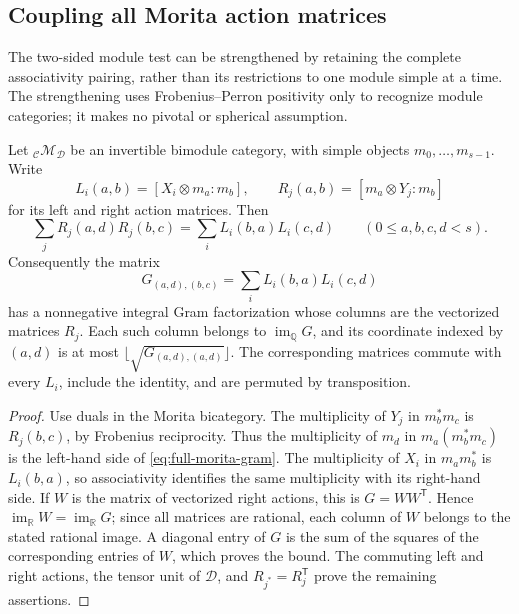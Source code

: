 \subsection{Coupling all Morita action matrices}\label{sec:full-morita-gram}
The two-sided module test can be strengthened by retaining the complete
associativity pairing, rather than its restrictions to one module simple at
a time. The strengthening uses Frobenius--Perron positivity only to recognize
module categories; it makes no pivotal or spherical assumption.

\begin{theorem}\label{thm:full-morita-gram}
Let ${}_{\mathcal C}\mathcal M_{\mathcal D}$ be an invertible bimodule
category, with simple objects $m_0,\ldots,m_{s-1}$. Write
\[
 L_i(a,b)=[X_i\otimes m_a:m_b],\qquad
 R_j(a,b)=[m_a\otimes Y_j:m_b]
\]
for its left and right action matrices. Then
\begin{equation}\label{eq:full-morita-gram}
 \sum_j R_j(a,d)R_j(b,c)
       =\sum_i L_i(b,a)L_i(c,d)
       \qquad(0\leq a,b,c,d<s).
\end{equation}
Consequently the matrix
\[
 G_{(a,d),(b,c)}=\sum_i L_i(b,a)L_i(c,d)
\]
has a nonnegative integral Gram factorization whose columns are the
vectorized matrices $R_j$. Each such column belongs to
$\operatorname{im}_{\mathbb Q}G$, and its coordinate indexed by $(a,d)$ is
at most $\lfloor\sqrt{G_{(a,d),(a,d)}}\rfloor$.
The corresponding matrices commute with every $L_i$, include the identity,
and are permuted by transposition.
\end{theorem}
\begin{proof}
Use duals in the Morita bicategory. The multiplicity of $Y_j$ in
$m_b^*m_c$ is $R_j(b,c)$, by Frobenius reciprocity. Thus the multiplicity
of $m_d$ in $m_a(m_b^*m_c)$ is the left-hand side of
\eqref{eq:full-morita-gram}. The multiplicity of $X_i$ in $m_am_b^*$ is
$L_i(b,a)$, so associativity identifies the same multiplicity with its
right-hand side. If $W$ is the matrix of vectorized right actions, this
is $G=WW^{\mathsf T}$. Hence
$\operatorname{im}_{\mathbb R}W=\operatorname{im}_{\mathbb R}G$; since all
matrices are rational, each column of $W$ belongs to the stated rational
image. A diagonal entry of $G$ is the sum of the squares of the
corresponding entries of $W$, which proves the bound. The commuting
left and right actions, the tensor unit of $\mathcal D$, and
$R_{j^*}=R_j^{\mathsf T}$ prove the remaining assertions.
\end{proof}

